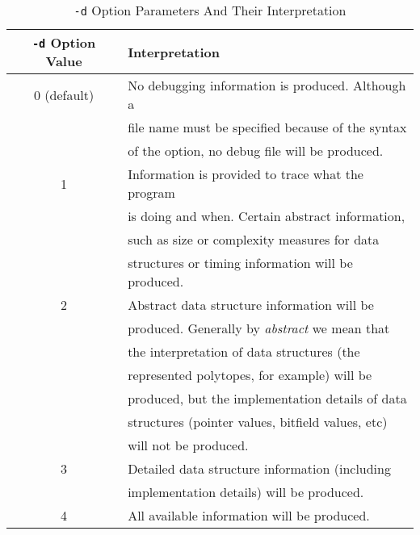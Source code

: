 \begin{table}
\begin{center}
\begin{tabular}{|c|l|}
\hline
\texttt{-d} Option Value & Interpretation \\
\hline
\hline
0 (default) & No debugging information is produced.  Although a              \\
            & file name must be specified because of the syntax              \\
            & of the option, no debug file will be produced.                 \\
\hline
1           & Information is provided to trace what the program              \\
            & is doing and when.  Certain abstract information,              \\
            & such as size or complexity measures for data                   \\
            & structures or timing information will be produced.             \\
\hline
2           & Abstract data structure information will be                    \\
            & produced.  Generally by \emph{abstract} we mean that           \\
            & the interpretation of data structures (the                     \\
            & represented polytopes, for example) will be                    \\
            & produced, but the implementation details of data               \\
            & structures (pointer values, bitfield values, etc)              \\
            & will not be produced.                                          \\
\hline
3           & Detailed data structure information (including                 \\
            & implementation details) will be produced.                      \\
\hline
4           & All available information will be produced.                    \\
\hline
\end{tabular}
\end{center}
\caption{\texttt{-d} Option Parameters And Their Interpretation}
\label{tbl:sinv0:sclo0:01}
\end{table}

